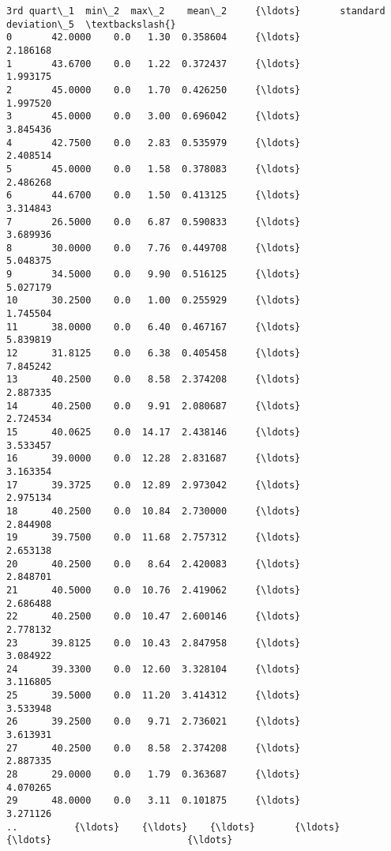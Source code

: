 \documentclass[11pt]{article}
\begin{document}
\begin{Verbatim}[commandchars=\\\{\}]
    3rd quart\_1  min\_2  max\_2    mean\_2     {\ldots}       standard deviation\_5  \textbackslash{}
0       42.0000    0.0   1.30  0.358604     {\ldots}                   2.186168   
1       43.6700    0.0   1.22  0.372437     {\ldots}                   1.993175   
2       45.0000    0.0   1.70  0.426250     {\ldots}                   1.997520   
3       45.0000    0.0   3.00  0.696042     {\ldots}                   3.845436   
4       42.7500    0.0   2.83  0.535979     {\ldots}                   2.408514   
5       45.0000    0.0   1.58  0.378083     {\ldots}                   2.486268   
6       44.6700    0.0   1.50  0.413125     {\ldots}                   3.314843   
7       26.5000    0.0   6.87  0.590833     {\ldots}                   3.689936   
8       30.0000    0.0   7.76  0.449708     {\ldots}                   5.048375   
9       34.5000    0.0   9.90  0.516125     {\ldots}                   5.027179   
10      30.2500    0.0   1.00  0.255929     {\ldots}                   1.745504   
11      38.0000    0.0   6.40  0.467167     {\ldots}                   5.839819   
12      31.8125    0.0   6.38  0.405458     {\ldots}                   7.845242   
13      40.2500    0.0   8.58  2.374208     {\ldots}                   2.887335   
14      40.2500    0.0   9.91  2.080687     {\ldots}                   2.724534   
15      40.0625    0.0  14.17  2.438146     {\ldots}                   3.533457   
16      39.0000    0.0  12.28  2.831687     {\ldots}                   3.163354   
17      39.3725    0.0  12.89  2.973042     {\ldots}                   2.975134   
18      40.2500    0.0  10.84  2.730000     {\ldots}                   2.844908   
19      39.7500    0.0  11.68  2.757312     {\ldots}                   2.653138   
20      40.2500    0.0   8.64  2.420083     {\ldots}                   2.848701   
21      40.5000    0.0  10.76  2.419062     {\ldots}                   2.686488   
22      40.2500    0.0  10.47  2.600146     {\ldots}                   2.778132   
23      39.8125    0.0  10.43  2.847958     {\ldots}                   3.084922   
24      39.3300    0.0  12.60  3.328104     {\ldots}                   3.116805   
25      39.5000    0.0  11.20  3.414312     {\ldots}                   3.533948   
26      39.2500    0.0   9.71  2.736021     {\ldots}                   3.613931   
27      40.2500    0.0   8.58  2.374208     {\ldots}                   2.887335   
28      29.0000    0.0   1.79  0.363687     {\ldots}                   4.070265   
29      48.0000    0.0   3.11  0.101875     {\ldots}                   3.271126   
..          {\ldots}    {\ldots}    {\ldots}       {\ldots}     {\ldots}                        {\ldots}   

\end{Verbatim}
\end{document}
